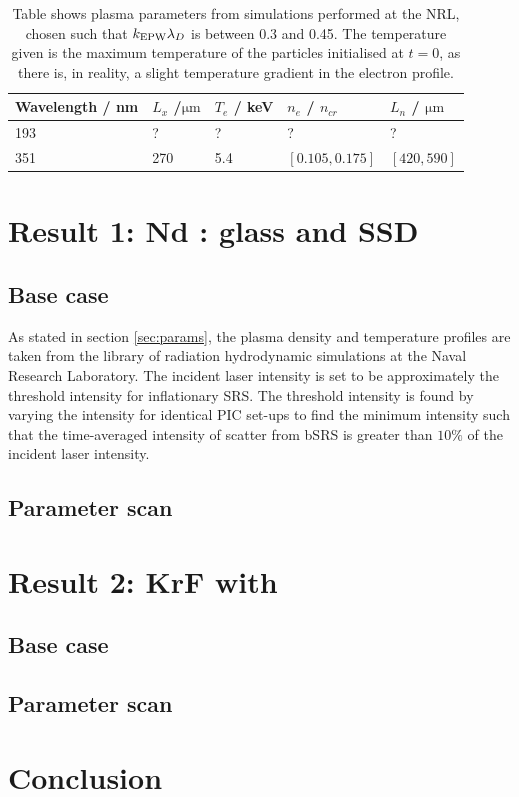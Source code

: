 \begin{table}[h]\label{tab:plasma}

\begin{tabular}{|l|l|l|l|l|}
\hline
Wavelength / nm & $L_x$ /$\si{\micro\metre}$ & $T_e$ / keV & $n_e$ / $n_{cr}$ & $L_n$ / $\si{\micro\metre}$
\\ \hline 
193 & ?   & ?   & ?               & ? \\ \hline
351 & 270 & 5.4 & $[0.105,0.175]$ & $[420,590]$ \\ \hline
\end{tabular}

\caption{Table shows plasma parameters from simulations performed at the NRL, chosen such that $k_\mathrm{EPW}\lambda_D$ is between 0.3 and 0.45. The temperature given is the maximum temperature of the particles initialised at $t=0$, as there is, in reality, a slight temperature gradient in the electron profile.}
\end{table}




\section{Result 1: Nd : glass and SSD}

\subsection{Base case}
As stated in section \ref{sec:params}, the plasma density and temperature profiles are taken from the library of radiation hydrodynamic simulations at the Naval Research Laboratory. The incident laser intensity is set to be approximately the threshold intensity for inflationary SRS. The threshold intensity is found by varying the intensity for identical PIC set-ups to find the minimum intensity such that the time-averaged intensity of scatter from bSRS is greater than $10\%$ of the incident laser intensity. 

\subsection{Parameter scan}


\section{Result 2: KrF with }


\subsection{Base case}
\subsection{Parameter scan}

\section{Conclusion}


%
%
